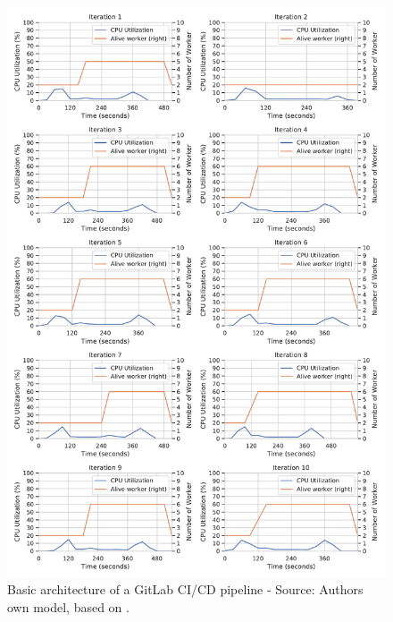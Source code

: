 \begin{figure}[h]
\centering
\includegraphics[scale=0.4]{images/07_evaluation/taxi/taxi_auto-scaler_performance}
\caption{Basic architecture of a GitLab CI/CD pipeline - Source: Authors own model, based on \cite{Gitlab2020Docs}.}
\label{fig:07_mortgage_static-cpu_results}
\end{figure}

